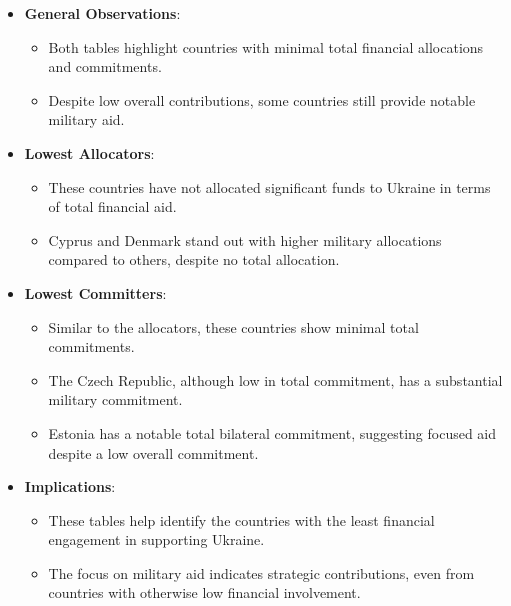 \documentclass[12pt,preprint, authoryear]{elsarticle}
\numberwithin{equation}{section}
\numberwithin{figure}{section}
\numberwithin{table}{section}
\def\tightlist{} %
\begin{document}
\begin{itemize}
\tightlist
\item
  \textbf{General Observations}:

  \begin{itemize}
  \tightlist
  \item
    Both tables highlight countries with minimal total financial
    allocations and commitments.
  \item
    Despite low overall contributions, some countries still provide
    notable military aid.
  \end{itemize}
\item
  \textbf{Lowest Allocators}:

  \begin{itemize}
  \tightlist
  \item
    These countries have not allocated significant funds to Ukraine in
    terms of total financial aid.
  \item
    Cyprus and Denmark stand out with higher military allocations
    compared to others, despite no total allocation.
  \end{itemize}
\item
  \textbf{Lowest Committers}:

  \begin{itemize}
  \tightlist
  \item
    Similar to the allocators, these countries show minimal total
    commitments.
  \item
    The Czech Republic, although low in total commitment, has a
    substantial military commitment.
  \item
    Estonia has a notable total bilateral commitment, suggesting focused
    aid despite a low overall commitment.
  \end{itemize}
\item
  \textbf{Implications}:

  \begin{itemize}
  \tightlist
  \item
    These tables help identify the countries with the least financial
    engagement in supporting Ukraine.
  \item
    The focus on military aid indicates strategic contributions, even
    from countries with otherwise low financial involvement.
  \end{itemize}
\end{itemize}


\end{document}
